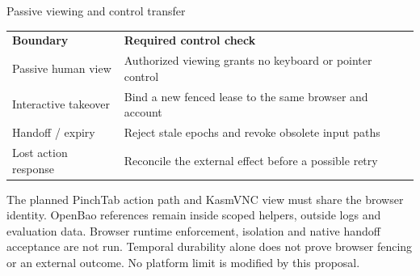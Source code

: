 \begin{frame}[label=fleet-control]{Passive viewing and control transfer}
\begin{tabular}{p{.25\linewidth}p{.66\linewidth}}
\textbf{Boundary} & \textbf{Required control check} \\
Passive human view & Authorized viewing grants no keyboard or pointer control \\
Interactive takeover & Bind a new fenced lease to the same browser and account \\
Handoff / expiry & Reject stale epochs and revoke obsolete input paths \\
Lost action response & Reconcile the external effect before a possible retry \\
\end{tabular}
\par\medskip
The planned PinchTab action path and KasmVNC view must share the browser identity.
OpenBao references remain inside scoped helpers, outside logs and evaluation data.
\vfill
{\footnotesize Browser runtime enforcement, isolation and native handoff acceptance
are not run. Temporal durability alone does not prove browser fencing or an
external outcome. No platform limit is modified by this proposal.}
\end{frame}
